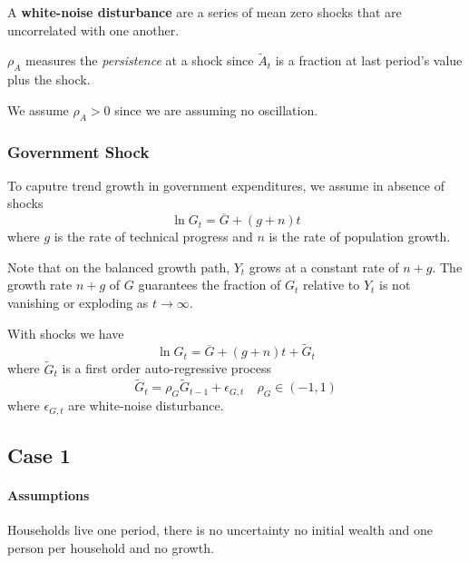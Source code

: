 \documentclass[11pt]{article}
\begin{document}
			\begin{definition}
				A \textbf{white-noise disturbance} are a series of mean zero shocks that are uncorrelated with one another.
			\end{definition}
			
			\begin{remark}
				$\rho_A$ measures the \emph{persistence} at a shock since $\tilde{A}_t$ is a fraction at last period's value plus the shock.
			\end{remark}
			\begin{assumption}
				We assume $\rho_A > 0$ since we are assuming no oscillation.
			\end{assumption}
			
		\subsubsection{Government Shock}
			\par To caputre trend growth in government expenditures, we assume in absence of shocks
			\begin{equation}
				\ln G_t = \overline{G} + (g+n)t
			\end{equation}
			where $g$ is the rate of technical progress and $n$ is the rate of population growth.
			
			\begin{remark}
				Note that on the balanced growth path, $Y_t$ grows at a constant rate of $n+g$. The growth rate $n+g$ of $G$ guarantees the fraction of $G_t$ relative to $Y_t$ is not vanishing or exploding as $t \to \infty$.
			\end{remark}
			With shocks we have
			\begin{equation}
				\ln G_t = \overline{G} + (g+n)t + \tilde{G}_t
			\end{equation}
			where $\tilde{G}_t$ is a first order auto-regressive process
			\begin{equation}
				\tilde{G}_t = \rho_G \tilde{G}_{t-1} + \epsilon_{G,t}\quad \rho_G \in (-1,1)
			\end{equation}
			where $\epsilon_{G,t}$ are white-noise disturbance.
			
			\subsection{Case 1}
				\paragraph{Assumptions} Households live one period, there is no uncertainty no initial wealth and one person per household and no growth.
\end{document}

